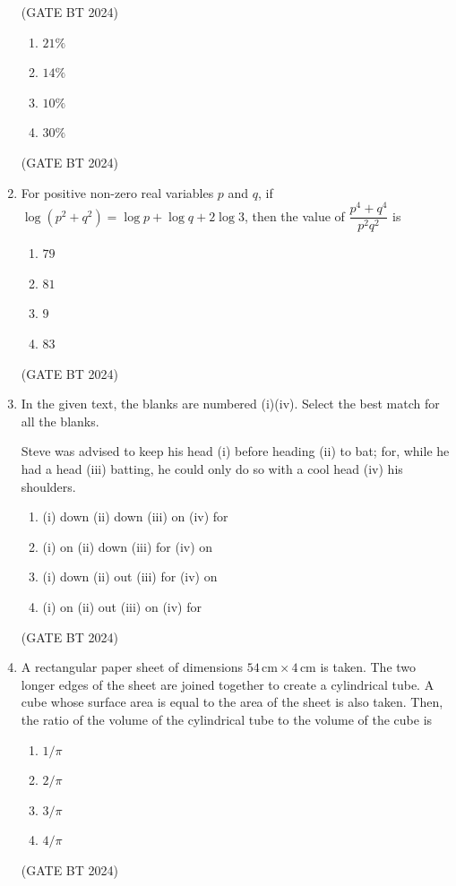 \documentclass[journal,12pt,onecolumn]{IEEEtran}
\theoremstyle{remark}
\begin{document}
\begin{enumerate}
\hfill (GATE BT 2024)


\begin{enumerate}
    \item $21\%$
    \item $14\%$
    \item $10\%$
    \item $30\%$
\end{enumerate}
\hfill(GATE BT 2024)

\item 
For positive non-zero real variables $p$ and $q$, if $\log(p^2+q^2)=\log p+\log q+2\log 3$, then the value of $\dfrac{p^4+q^4}{p^2 q^2}$ is

\begin{enumerate}
    \item $79$
    \item $81$
    \item $9$
    \item $83$
\end{enumerate}
\hfill(GATE BT 2024)

\item 
In the given text, the blanks are numbered (i)(iv). Select the best match for all the blanks. 

Steve was advised to keep his head (i) before heading (ii) to bat; for, while he had a head (iii) batting, he could only do so with a cool head (iv) his shoulders. 

\begin{enumerate}
    \item (i) down (ii) down (iii) on (iv) for
    \item (i) on (ii) down (iii) for  (iv) on
    \item (i) down (ii) out (iii) for (iv) on
    \item (i) on (ii) out  (iii) on (iv) for
\end{enumerate}
\hfill(GATE BT 2024)

\item 
A rectangular paper sheet of dimensions $54\,\text{cm} \times 4\,\text{cm}$ is taken. The two longer edges of the sheet are joined together to create a cylindrical tube. A cube whose surface area is equal to the area of the sheet is also taken. Then, the ratio of the volume of the cylindrical tube to the volume of the cube is

\begin{enumerate}
    \item $1/\pi$
    \item $2/\pi$
    \item $3/\pi$
    \item $4/\pi$
\end{enumerate}
\hfill(GATE BT 2024)


\end{enumerate}
\end{document}
